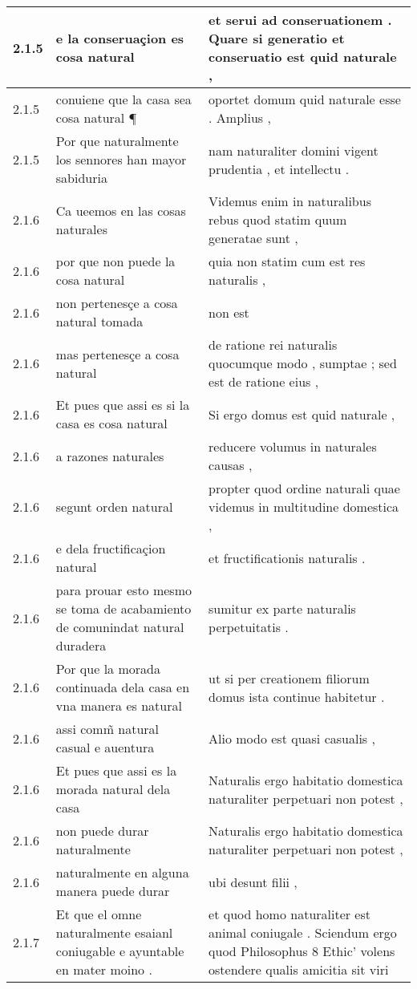 \begin{tabular}{|p{1cm}|p{6.5cm}|p{6.5cm}|}
2.1.5 & e la conseruaçion es cosa natural & et serui ad conseruationem . Quare si generatio et conseruatio est quid naturale , \\\hline
2.1.5 & conuiene que la casa sea cosa natural ¶ & oportet domum quid naturale esse . Amplius , \\\hline
2.1.5 & Por que naturalmente los sennores han mayor sabiduria & nam naturaliter domini vigent prudentia , et intellectu . \\\hline
2.1.6 & Ca ueemos en las cosas naturales & Videmus enim in naturalibus rebus quod statim quum generatae sunt , \\\hline
2.1.6 & por que non puede la cosa natural & quia non statim cum est res naturalis , \\\hline
2.1.6 & non pertenesçe a cosa natural tomada & non est \\\hline
2.1.6 & mas pertenesçe a cosa natural & de ratione rei naturalis quocumque modo , sumptae ; sed est de ratione eius , \\\hline
2.1.6 & Et pues que assi es si la casa es cosa natural & Si ergo domus est quid naturale , \\\hline
2.1.6 & a razones naturales & reducere volumus in naturales causas , \\\hline
2.1.6 & segunt orden natural & propter quod ordine naturali quae videmus in multitudine domestica , \\\hline
2.1.6 & e dela fructificaçion natural & et fructificationis naturalis . \\\hline
2.1.6 & para prouar esto mesmo se toma de acabamiento de comunindat natural duradera & sumitur ex parte naturalis perpetuitatis . \\\hline
2.1.6 & Por que la morada continuada dela casa en vna manera es natural & ut si per creationem filiorum domus ista continue habitetur . \\\hline
2.1.6 & assi comm̃ natural casual e auentura & Alio modo est quasi casualis , \\\hline
2.1.6 & Et pues que assi es la morada natural dela casa & Naturalis ergo habitatio domestica naturaliter perpetuari non potest , \\\hline
2.1.6 & non puede durar naturalmente & Naturalis ergo habitatio domestica naturaliter perpetuari non potest , \\\hline
2.1.6 & naturalmente en alguna manera puede durar & ubi desunt filii , \\\hline
2.1.7 & Et que el omne naturalmente esaianl coniugable e ayuntable en mater moino . & et quod homo naturaliter est animal coniugale . Sciendum ergo quod Philosophus 8 Ethic’ volens ostendere qualis amicitia sit viri \\\hline

\end{tabular}
